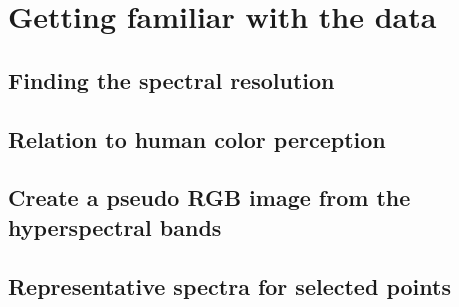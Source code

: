 \section{Getting familiar with the data}

\subsection{Finding the spectral resolution}

\subsection{Relation to human color perception}

\subsection{Create a pseudo RGB image from the hyperspectral bands}

\subsection{Representative spectra for selected points}
